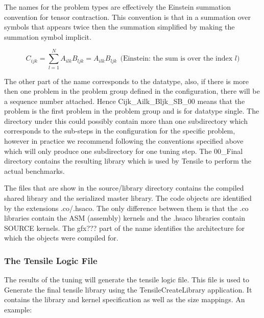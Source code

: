 \documentclass[]{article}
\begin{document}
The names for the problem types are effectively the Einstein summation convention for tensor contraction. This convention is that in a summation over symbols that appears twice then the summation simplified by making the summation symbol implicit.  

\[ C_{ijk} = \sum_{l=1}^{N} A_{ilk} B_{ljk} = A_{ilk} B_{ljk}\ \ \text{(Einstein: the sum is over the index $l$)}\]

The other part of the name corresponds to the datatype, also, if there is more then one problem in the problem group defined in the configuration, there will be a sequence number attached. Hence Cijk\_Ailk\_Bljk\_SB\_00 means that the problem is the first problem in the problem group and is for datatype single. The directory under this could possibly contain more than one subdirectory which corresponds to the sub-steps in the configuration for the specific problem, however in practice we recommend following the conventions specified above which will only produce one subdirectory for one tuning step. The 00\_Final directory contains the resulting library which is used by Tensile to perform the actual benchmarks. 

The files that are show in the source/library directory contains the compiled shared library and the serialized master library. The code objects are identified by the extensions .co/.hsaco. The only difference between them is that the .co libraries contain the ASM (assembly) kernels and the .hsaco libraries contain SOURCE kernels. The gfx??? part of the name identifies the architecture for which the objects were compiled for.


\subsubsection{The Tensile Logic File}
\label{sec:logicFile}


The results of the tuning will generate the tensile logic file. This file is used to Generate the final tensile library using the TensileCreateLibrary application. It contains the library and kernel specification as well as the size mappings. An example:
\end{document}
